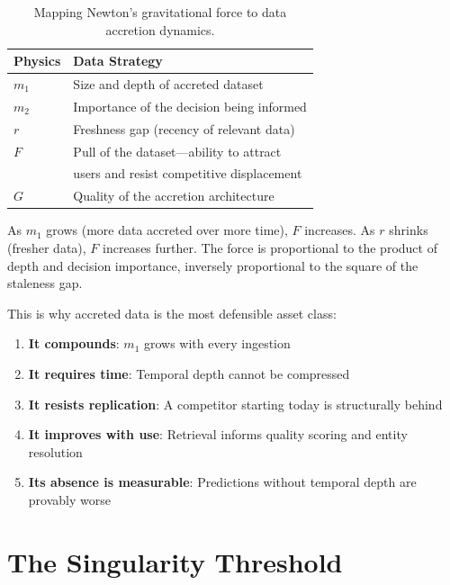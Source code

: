 \documentclass[11pt,twocolumn]{article}
\begin{document}
\begin{table}[H]
\centering
\small
\begin{tabular}{@{}ll@{}}
\toprule
\textbf{Physics} & \textbf{Data Strategy} \\
\midrule
$m_1$  & Size and depth of accreted dataset \\
$m_2$  & Importance of the decision being informed \\
$r$    & Freshness gap (recency of relevant data) \\
$F$    & Pull of the dataset---ability to attract \\
       & users and resist competitive displacement \\
$G$    & Quality of the accretion architecture \\
\bottomrule
\end{tabular}
\caption{Mapping Newton's gravitational force to data accretion dynamics.}
\label{tab:gravity}
\end{table}

As $m_1$ grows (more data accreted over more time), $F$ increases. As $r$ shrinks (fresher data), $F$ increases further. The force is proportional to the product of depth and decision importance, inversely proportional to the square of the staleness gap.

This is why accreted data is the most defensible asset class:

\begin{enumerate}[nosep,leftmargin=1.5em]
  \item \textbf{It compounds}: $m_1$ grows with every ingestion
  \item \textbf{It requires time}: Temporal depth cannot be compressed
  \item \textbf{It resists replication}: A competitor starting today is structurally behind
  \item \textbf{It improves with use}: Retrieval informs quality scoring and entity resolution
  \item \textbf{Its absence is measurable}: Predictions without temporal depth are provably worse
\end{enumerate}

\section{The Singularity Threshold}
\end{document}
